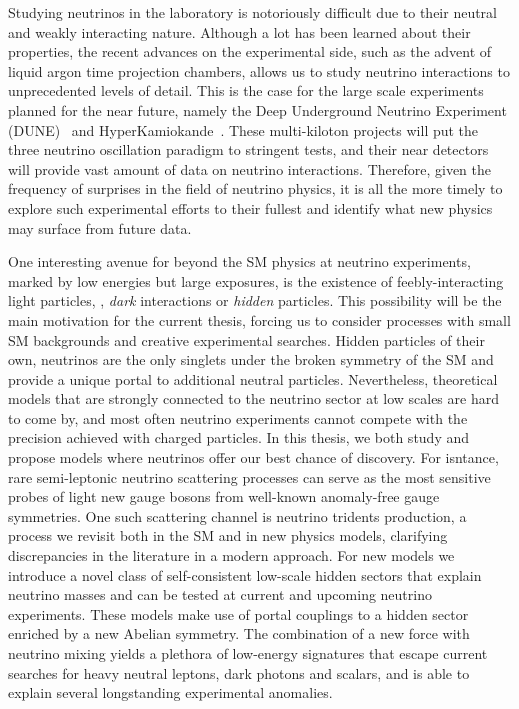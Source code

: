 \documentclass[openany,twoside,frontopenright,openright]{ip3thesis}
\begin{document}
Studying neutrinos in the laboratory is notoriously difficult due to their neutral and weakly interacting nature. Although a lot has been learned about their properties, the recent advances on the experimental side, such as the advent of liquid argon time projection chambers, allows us to study neutrino interactions to unprecedented levels of detail. This is the case for the large scale experiments planned for the near future, namely the Deep Underground Neutrino Experiment (DUNE)~\cite{Acciarri:2015uup} and HyperKamiokande~\cite{Abe:2018uyc}. These multi-kiloton projects will put the three neutrino oscillation paradigm to stringent tests, and their near detectors will provide vast amount of data on neutrino interactions. Therefore, given the frequency of surprises in the field of neutrino physics, it is all the more timely to explore such experimental efforts to their fullest and identify what new physics may surface from future data. 

One interesting avenue for beyond the SM physics at neutrino experiments, marked by low energies but large exposures, is the existence of feebly-interacting light particles, \eg, \emph{dark} interactions or \emph{hidden} particles. This possibility will be the main motivation for the current thesis, forcing us to consider processes with small SM backgrounds and creative experimental searches. Hidden particles of their own, neutrinos are the only singlets under the broken symmetry of the SM and provide a unique portal to additional neutral particles. Nevertheless, theoretical models that are strongly connected to the neutrino sector at low scales are hard to come by, and most often neutrino experiments cannot compete with the precision achieved with charged particles. In this thesis, we both study and propose models where neutrinos offer our best chance of discovery. For isntance, rare semi-leptonic neutrino scattering processes can serve as the most sensitive probes of light new gauge bosons from well-known anomaly-free gauge symmetries. One such scattering channel is neutrino tridents production, a process we revisit both in the SM and in new physics models, clarifying discrepancies in the literature in a modern approach. For new models we introduce a novel class of self-consistent low-scale hidden sectors that explain neutrino masses and can be tested at current and upcoming neutrino experiments. These models make use of portal couplings to a hidden sector enriched by a new Abelian symmetry. The combination of a new force with neutrino mixing yields a plethora of low-energy signatures that escape current searches for heavy neutral leptons, dark photons and scalars, and is able to explain several longstanding experimental anomalies.
\end{document}
